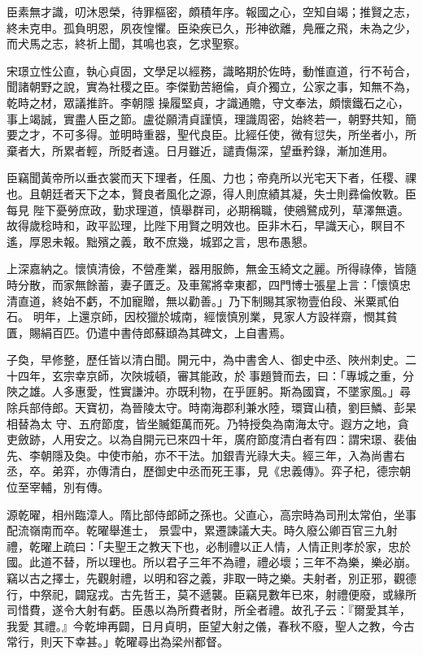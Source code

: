 \begin{pinyinscope}
 臣素無才識，叨沐恩榮，待罪樞密，頗積年序。報國之心，空知自竭；推賢之志，終未克申。孤負明恩，夙夜惶懼。臣染疾已久，形神欲離，鳧雁之飛，未為之少，而犬馬之志，終祈上聞，其鳴也哀，乞求聖察。



 宋璟立性公直，執心貞固，文學足以經務，識略期於佐時，動惟直道，行不茍合，聞諸朝野之說，實為社稷之臣。李傑勤苦絕倫，貞介獨立，公家之事，知無不為，乾時之材，眾議推許。李朝隱
 操履堅貞，才識通贍，守文奉法，頗懷鐵石之心，事上竭誠，實盡人臣之節。盧從願清貞謹慎，理識周密，始終若一，朝野共知，簡要之才，不可多得。並明時重器，聖代良臣。比經任使，微有愆失，所坐者小，所棄者大，所累者輕，所貶者遠。日月雖近，譴責傷深，望垂矜錄，漸加進用。



 臣竊聞黃帝所以垂衣裳而天下理者，任風、力也；帝堯所以光宅天下者，任稷、祼也。且朝廷者天下之本，賢良者風化之源，得人則庶績其凝，失士則彞倫攸斁。臣每見
 陛下憂勞庶政，勤求理道，慎舉群司，必期稱職，使鵷鷺成列，草澤無遺。故得歲稔時和，政平訟理，比陛下用賢之明效也。臣非木石，早識天心，瞑目不遙，厚恩未報。黜殯之義，敢不庶幾，城郢之言，思布愚懇。



 上深嘉納之。懷慎清儉，不營產業，器用服飾，無金玉綺文之麗。所得祿俸，皆隨時分散，而家無餘蓄，妻子匱乏。及車駕將幸東都，四門博士張星上言：「懷慎忠清直道，終始不虧，不加寵贈，無以勸善。」乃下制賜其家物壹伯段、米粟貳伯石。
 明年，上還京師，因校獵於城南，經懷慎別業，見家人方設祥齋，憫其貧匱，賜絹百匹。仍遣中書侍郎蘇頲為其碑文，上自書焉。



 子奐，早修整，歷任皆以清白聞。開元中，為中書舍人、御史中丞、陜州刺史。二十四年，玄宗幸京師，次陜城頓，審其能政，於事題贊而去，曰：「專城之重，分陜之雄。人多惠愛，性實謙沖。亦既利物，在乎匪躬。斯為國寶，不墜家風。」尋除兵部侍郎。天寶初，為晉陵太守。時南海郡利兼水陸，環寶山積，劉巨鱗、彭杲相替為太
 守、五府節度，皆坐贓鉅萬而死。乃特授奐為南海太守。遐方之地，貪吏斂跡，人用安之。以為自開元已來四十年，廣府節度清白者有四：謂宋璟、裴伷先、李朝隱及奐。中使市舶，亦不干法。加銀青光祿大夫。經三年，入為尚書右丞，卒。弟弈，亦傳清白，歷御史中丞而死王事，見《忠義傳》。弈子杞，德宗朝位至宰輔，別有傳。



 源乾曜，相州臨漳人。隋比部侍郎師之孫也。父直心，高宗時為司刑太常伯，坐事配流嶺南而卒。乾曜舉進士，
 景雲中，累遷諫議大夫。時久廢公卿百官三九射禮，乾曜上疏曰：「夫聖王之教天下也，必制禮以正人情，人情正則孝於家，忠於國。此道不替，所以理也。所以君子三年不為禮，禮必壞；三年不為樂，樂必崩。竊以古之擇士，先觀射禮，以明和容之義，非取一時之樂。夫射者，別正邪，觀德行，中祭祀，闢寇戎。古先哲王，莫不遞襲。臣竊見數年已來，射禮便廢，或緣所司惜費，遂令大射有虧。臣愚以為所費者財，所全者禮。故孔子云：『爾愛其羊，我愛
 其禮。』今乾坤再闢，日月貞明，臣望大射之儀，春秋不廢，聖人之教，今古常行，則天下幸甚。」乾曜尋出為梁州都督。




\end{pinyinscope}
